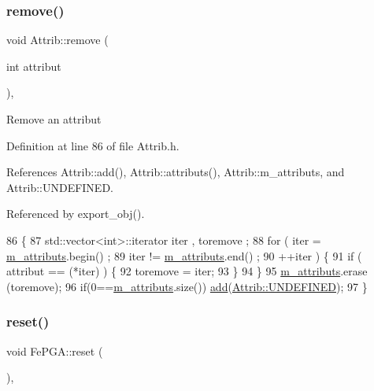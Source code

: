 \subsubsection{\texorpdfstring{remove()}{remove()}}
{\footnotesize\ttfamily void Attrib\+::remove (\begin{DoxyParamCaption}\item[{int}]{attribut }\end{DoxyParamCaption})\hspace{0.3cm}{\ttfamily [inline]}, {\ttfamily [inherited]}}

Remove an attribut 

Definition at line 86 of file Attrib.\+h.



References Attrib\+::add(), Attrib\+::attributs(), Attrib\+::m\+\_\+attributs, and Attrib\+::\+U\+N\+D\+E\+F\+I\+N\+ED.



Referenced by export\+\_\+obj().


\begin{DoxyCode}
86                                \{
87     std::vector<int>::iterator iter , toremove ;
88     \textcolor{keywordflow}{for} ( iter  = \hyperlink{classAttrib_ac4bd58a0cc6b38a3b711d609a3d3aacc}{m\_attributs}.begin() ;
89           iter != \hyperlink{classAttrib_ac4bd58a0cc6b38a3b711d609a3d3aacc}{m\_attributs}.end()   ;
90           ++iter ) \{
91       \textcolor{keywordflow}{if} ( attribut == (*iter) ) \{
92         toremove = iter;
93       \}
94     \}
95     \hyperlink{classAttrib_ac4bd58a0cc6b38a3b711d609a3d3aacc}{m\_attributs}.erase (toremove);
96     \textcolor{keywordflow}{if}(0==\hyperlink{classAttrib_ac4bd58a0cc6b38a3b711d609a3d3aacc}{m\_attributs}.size()) \hyperlink{classAttrib_a235f773af19c900264a190b00a3b4ad7}{add}(\hyperlink{classAttrib_a69e171d7cc6417835a5a306d3c764235a3a8da2ab97dda18aebab196fe4100531}{Attrib::UNDEFINED});
97   \}
\end{DoxyCode}
\mbox{\label{classFePGA_abdf7a9dd901351a7eafd748d35172a3c}} 
\subsubsection{\texorpdfstring{reset()}{reset()}}
{\footnotesize\ttfamily void Fe\+P\+G\+A\+::reset (\begin{DoxyParamCaption}{ }\end{DoxyParamCaption})\hspace{0.3cm}{\ttfamily [inline]}, {\ttfamily [virtual]}}

